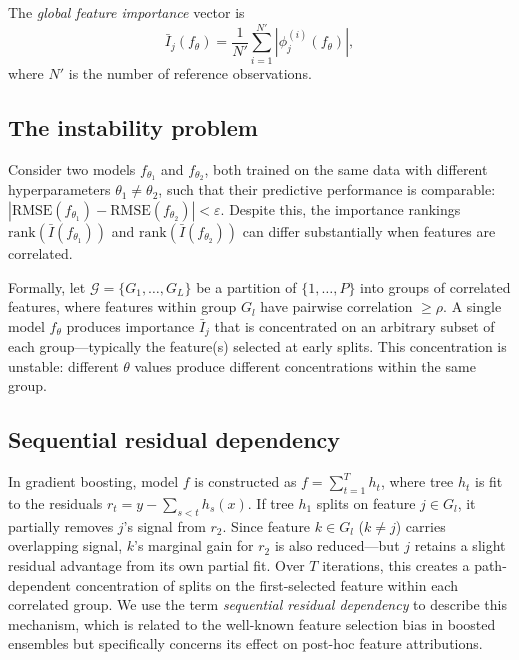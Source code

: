 \documentclass[11pt]{article}
\newcommand{\rhovar}{\rho}
\begin{document}
The \emph{global feature importance} vector is
\begin{equation}
  \bar{I}_j(f_\theta) = \frac{1}{N'} \sum_{i=1}^{N'} |\phi_j^{(i)}(f_\theta)|,
  \label{eq:global_importance}
\end{equation}
where $N'$ is the number of reference observations.

\subsection{The instability problem}

Consider two models $f_{\theta_1}$ and $f_{\theta_2}$, both trained on the
same data with different hyperparameters $\theta_1 \neq \theta_2$, such
that their predictive performance is comparable:
$|\text{RMSE}(f_{\theta_1}) - \text{RMSE}(f_{\theta_2})| < \varepsilon$.
Despite this, the importance rankings
$\text{rank}(\bar{I}(f_{\theta_1}))$ and
$\text{rank}(\bar{I}(f_{\theta_2}))$ can differ substantially when
features are correlated.

Formally, let $\mathcal{G} = \{G_1, \ldots, G_L\}$ be a partition of
$\{1, \ldots, P\}$ into groups of correlated features, where features
within group $G_l$ have pairwise correlation $\geq \rhovar$. A single
model $f_\theta$ produces importance $\bar{I}_j$ that is concentrated on
an arbitrary subset of each group---typically the feature(s) selected at
early splits. This concentration is unstable: different $\theta$ values
produce different concentrations within the same group.

\subsection{Sequential residual dependency}

In gradient boosting, model $f$ is constructed as $f =
\sum_{t=1}^{T} h_t$, where tree $h_t$ is fit to the residuals
$r_t = y - \sum_{s<t} h_s(x)$. If tree $h_1$ splits on feature $j \in
G_l$, it partially removes $j$'s signal from $r_2$. Since feature $k
\in G_l$ ($k \neq j$) carries overlapping signal, $k$'s marginal gain
for $r_2$ is also reduced---but $j$ retains a slight residual advantage
from its own partial fit. Over $T$ iterations, this creates a
path-dependent concentration of splits on the first-selected feature
within each correlated group. We use the term \emph{sequential residual
dependency} to describe this mechanism, which is related to the
well-known feature selection bias in boosted ensembles but specifically
concerns its effect on post-hoc feature attributions.
\end{document}
